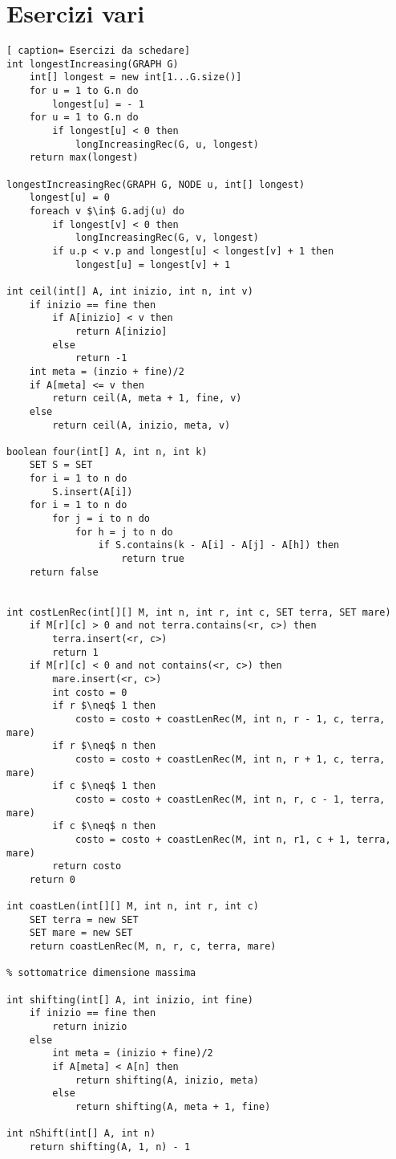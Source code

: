 \documentclass[../cheatSheetAlgoritmi.tex]{subfiles}
\begin{document}
\section{Esercizi vari}
\begin{lstlisting}[ caption= Esercizi da schedare]
int longestIncreasing(GRAPH G)
	int[] longest = new int[1...G.size()]
  	for u = 1 to G.n do
    	longest[u] = - 1
  	for u = 1 to G.n do
    	if longest[u] < 0 then
      		longIncreasingRec(G, u, longest)
  	return max(longest)

longestIncreasingRec(GRAPH G, NODE u, int[] longest)
	longest[u] = 0
  	foreach v $\in$ G.adj(u) do
    	if longest[v] < 0 then
      		longIncreasingRec(G, v, longest)
    	if u.p < v.p and longest[u] < longest[v] + 1 then
   			longest[u] = longest[v] + 1

int ceil(int[] A, int inizio, int n, int v)
	if inizio == fine then
    	if A[inizio] < v then
     		return A[inizio]
    	else
      		return -1
  	int meta = (inzio + fine)/2
  	if A[meta] <= v then
    	return ceil(A, meta + 1, fine, v)
  	else
    	return ceil(A, inizio, meta, v)

boolean four(int[] A, int n, int k) 
	SET S = SET
  	for i = 1 to n do 
    	S.insert(A[i])
  	for i = 1 to n do 
    	for j = i to n do 
      		for h = j to n do 
        		if S.contains(k - A[i] - A[j] - A[h]) then 
          			return true
  	return false
  

int costLenRec(int[][] M, int n, int r, int c, SET terra, SET mare)
	if M[r][c] > 0 and not terra.contains(<r, c>) then 
    	terra.insert(<r, c>)
    	return 1
  	if M[r][c] < 0 and not contains(<r, c>) then
    	mare.insert(<r, c>)
    	int costo = 0
    	if r $\neq$ 1 then
      		costo = costo + coastLenRec(M, int n, r - 1, c, terra, mare)
    	if r $\neq$ n then
      		costo = costo + coastLenRec(M, int n, r + 1, c, terra, mare)
    	if c $\neq$ 1 then
      		costo = costo + coastLenRec(M, int n, r, c - 1, terra, mare)
    	if c $\neq$ n then
      		costo = costo + coastLenRec(M, int n, r1, c + 1, terra, mare)
    	return costo
 	return 0

int coastLen(int[][] M, int n, int r, int c)
	SET terra = new SET
  	SET mare = new SET
  	return coastLenRec(M, n, r, c, terra, mare)
  
% sottomatrice dimensione massima

int shifting(int[] A, int inizio, int fine)
	if inizio == fine then
    	return inizio
  	else
    	int meta = (inizio + fine)/2
    	if A[meta] < A[n] then
      		return shifting(A, inizio, meta)
    	else
      		return shifting(A, meta + 1, fine)

int nShift(int[] A, int n)
	return shifting(A, 1, n) - 1
\end{lstlisting}
\newpage
\end{document}
